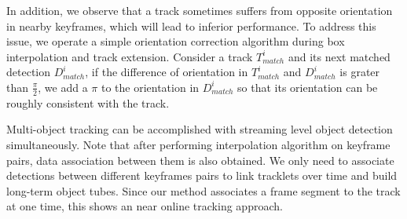 \documentclass[letterpaper, 10pt, conference]{ieeeconf}  %
\begin{document}
In addition, we observe that a track sometimes suffers from opposite orientation in nearby keyframes, which will lead to inferior performance. To address this issue, we operate a simple orientation correction algorithm during box interpolation and track extension. Consider a track $T^i_{match}$ and its next matched detection $D^i_{match}$, if the difference of orientation in $T^i_{match}$ and $D^i_{match}$ is grater than $\frac{\pi}{2}$, we add a $\pi$ to the orientation in $D^i_{match}$ so that its orientation can be roughly consistent with the track. 

Multi-object tracking can be accomplished with streaming level object detection simultaneously. Note that after performing interpolation algorithm on keyframe pairs, data association between them is also obtained. We only need to associate detections between different keyframes pairs to link tracklets over time and build long-term object tubes. Since our method associates a frame segment to the track at one time, this shows an near online tracking approach.

\end{document}
